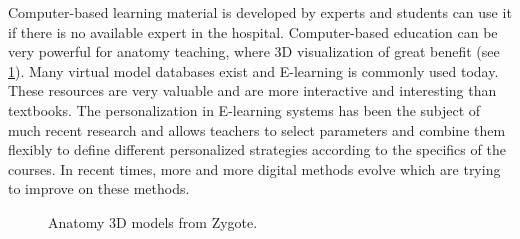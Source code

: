 Computer-based learning material is developed by experts and students can use it if there is no available expert in the hospital. Computer-based education can be very powerful for anatomy teaching, where 3D visualization of great benefit (see \figurename{\ref{fig:2-bg:zygote-body-esplorazione}}). Many virtual model databases exist and E-learning is commonly used today. These resources are very valuable and are more interactive and interesting than textbooks. 
The personalization in E-learning systems has been the subject of much recent research and allows teachers to select parameters and combine them flexibly to define different personalized strategies according to the specifics of the courses. In recent times, more and more digital methods evolve which are trying to improve on these methods. 
\begin{figure}
\centering
{}
\qquad
{}
\caption{Anatomy 3D models from Zygote.}
\label{fig:2-bg:zygote-body-esplorazione}
\end{figure}

